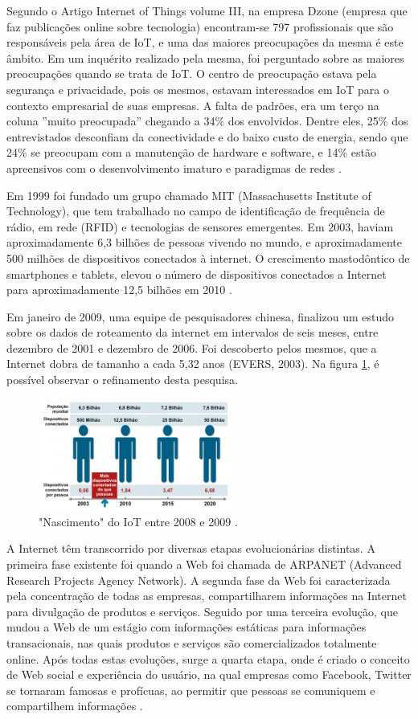 \documentclass[journal]{IEEEtran}
\begin{document}
Segundo o Artigo Internet of Things volume III, na empresa Dzone (empresa que faz publicações online sobre tecnologia) encontram-se 797 profissionais que são responsáveis pela área de IoT, e uma das maiores preocupações da mesma é este âmbito. Em um inquérito realizado pela mesma, foi perguntado sobre as maiores preocupações quando se trata de IoT. O centro de preocupação estava pela segurança e privacidade, pois os mesmos, estavam interessados em IoT para o contexto empresarial de suas empresas. A falta de padrões, era um terço na coluna ''muito preocupada'' chegando a 34\% dos envolvidos. Dentre eles, 25\% dos entrevistados desconfiam da conectividade e do baixo custo de energia, sendo que 24\% se preocupam com a manutenção de hardware e software, e 14\% estão apreensivos com o desenvolvimento imaturo e paradigmas de redes \cite[p.~4]{Evans}.

Em 1999 foi fundado um grupo chamado MIT (Massachusetts Institute of Technology), que tem trabalhado no campo de identificação de frequência de rádio, em rede (RFID) e tecnologias de sensores emergentes. Em 2003, haviam aproximadamente 6,3 bilhões de pessoas vivendo no mundo, e aproximadamente 500 milhões de dispositivos conectados à internet. O crescimento mastodôntico de smartphones e tablets, elevou o número de dispositivos conectados a Internet para aproximadamente 12,5 bilhões em 2010 \cite[p.~3]{Evans}.

Em janeiro de 2009, uma equipe de pesquisadores chinesa, finalizou um estudo sobre os dados de roteamento da internet em intervalos de seis meses, entre dezembro de 2001 e dezembro de 2006. Foi descoberto pelos mesmos, que a Internet dobra de tamanho a cada 5,32 anos (EVERS, 2003). Na figura \ref{fig_um}, é possível observar o refinamento desta pesquisa.

\begin{figure}[H]
\centering
\includegraphics[width=2.5in]{um}
\caption{"Nascimento" do IoT entre 2008 e 2009 \cite{Evans}.}
\label{fig_um}
\end{figure}


A Internet têm transcorrido por diversas etapas evolucionárias distintas. A primeira fase existente foi quando a Web foi chamada de ARPANET (Advanced Research Projects Agency Network). A segunda fase da Web foi caracterizada pela concentração de todas as empresas, compartilharem informações na Internet para divulgação de produtos e serviços. Seguido por uma terceira evolução, que mudou a Web de um estágio com informações estáticas para informações transacionais, nas quais produtos e serviços são comercializados totalmente online. Após todas estas evoluções, surge a quarta etapa, onde é criado o conceito de Web social e experiência do usuário, na qual empresas como Facebook, Twitter se tornaram famosas e profícuas, ao permitir que pessoas se comuniquem e compartilhem informações \cite[p.~6]{Evans}.
\end{document}
